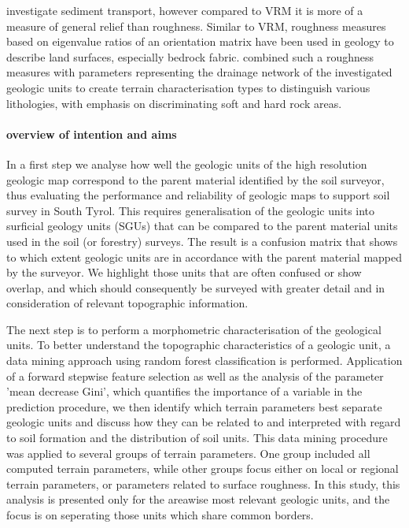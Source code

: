 \documentclass[preprint,12pt,authoryear]{elsarticle}
\begin{document}
investigate sediment transport, however compared to VRM  it is more of a measure of general relief than roughness. Similar to VRM, roughness measures based on eigenvalue ratios of an orientation matrix have been used in geology to describe land surfaces, especially bedrock fabric. \cite{Coblentz2014} combined such a roughness measures with parameters representing the drainage network of the investigated geologic units  to create terrain characterisation types to distinguish various lithologies, with emphasis on discriminating soft and hard rock areas.

\paragraph{overview of intention and aims}
In a first step we analyse how well the geologic units of the high resolution geologic map correspond to the parent material identified by the soil surveyor, thus evaluating the performance and reliability of geologic maps to support soil survey in South Tyrol. This requires generalisation of the geologic units into surficial geology units (SGUs) that can be compared to the parent material units used in the soil (or forestry) surveys.  The result is a confusion matrix that shows to which extent geologic units are in accordance with the parent material mapped by the surveyor. We highlight those units that are often confused or show overlap, and which should consequently be surveyed with greater detail and in consideration of relevant topographic information.

The next step is to perform a morphometric characterisation of the geological units. To better understand the topographic characteristics of a geologic unit, a data mining approach using random forest classification is performed. Application of a forward stepwise feature selection as well as the analysis of the parameter 'mean decrease Gini', which quantifies the importance of a variable in the prediction procedure, we then identify which terrain parameters best separate geologic units and discuss how they can be related to and interpreted with regard to soil formation and the distribution of soil units. This data mining procedure was applied to several groups of terrain parameters. One group included all computed terrain parameters, while other groups focus either on local or regional terrain parameters, or parameters related to surface roughness. In this study, this analysis is presented only for the areawise most relevant geologic units, and the focus is on seperating those units which share common borders.
\end{document}
